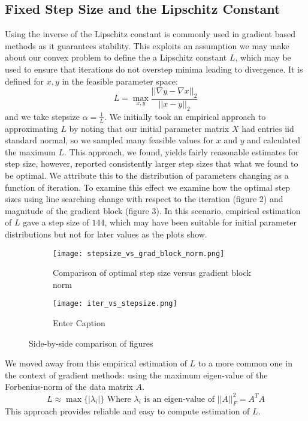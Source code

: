 \documentclass{article}
\begin{document}
\subsection{Fixed Step Size and the Lipschitz Constant}
Using the inverse of the Lipschitz constant is commonly used in gradient based methods as it guarantees stability. This exploits an assumption we may make about our convex problem to define the a Lipschitz constant $L$, which may be used to ensure that iterations do not overstep minima leading to divergence. It is defined for $x,y$ in the feasible parameter space:
$$L = \max_{x,y} \frac{||\nabla y - \nabla x||_2}{||x - y||_2}$$
and we take stepsize $\alpha=\frac{1}{L}$.
We initially took an empirical approach to approximating $L$ by noting that our initial parameter matrix $X$ had entries iid standard normal, so we sampled many feasible values for $x$ and $y$ and calculated the maximum $L$. This approach, we found, yields fairly reasonable estimates for step size, however, reported consistently larger step sizes that what we found to be optimal. We attribute this to the distribution of parameters changing as a function of iteration. To examine this effect we examine how the optimal step sizes using line searching change with respect to the iteration (figure 2) and magnitude of the gradient block (figure 3). In this scenario, empirical estimation of $L$ gave a step size of $144$, which may have been suitable for initial parameter distributions but not for later values as the plots show.
\begin{figure}[H]
    \centering
    \begin{subfigure}[b]{0.45\linewidth}  %
        \centering
        \texttt{[image: stepsize\_vs\_grad\_block\_norm.png]}
        \caption{Comparison of optimal step size versus gradient block norm}
        \label{fig:stepsize_block}
    \end{subfigure}
    \hfill
    \begin{subfigure}[b]{0.45\linewidth}  %
        \centering
        \texttt{[image: iter\_vs\_stepsize.png]}
        \caption{Enter Caption}
        \label{fig:enter-label}
    \end{subfigure}
    \caption{Side-by-side comparison of figures}
    \label{fig:side_by_side}
\end{figure}
We moved away from this empirical estimation of $L$ to a more common one in the context of gradient methods: using the maximum eigen-value of the Forbenius-norm of the data matrix $A$.
$$L\approx\max\{|\lambda_i|\} \text{ Where } \lambda_i \text{ is an eigen-value of }||A||_F^2 = A^TA$$
This approach provides reliable and easy to compute estimation of $L$.
\end{document}
